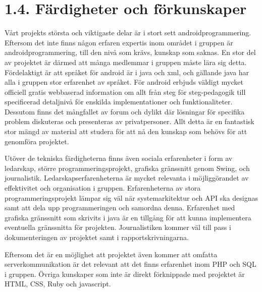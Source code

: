 \section{1.4. Färdigheter och förkunskaper}
Vårt projekts största och viktigaste delar är i stort sett androidprogrammering. Eftersom det inte finns någon erfaren expertis inom området i gruppen är androidprogrammering, till den nivå som krävs, kunskap som saknas. En stor del av projektet är därmed att många medlemmar i gruppen måste lära sig detta. Fördelaktigt är att språket för android är i java och xml, och gällande java har alla i gruppen stor erfarenhet av språket. För android erbjuds väldigt mycket officiell gratis webbaserad information om allt från steg för steg-pedagogik till specificerad detaljnivå för enskilda implementationer och funktionaliteter. Dessutom finns det mångfallet av forum och dylikt där lösningar för specifika problem diskuteras och presenteras av privatpersoner. Allt detta är en fantastisk stor mängd av material att studera för att nå den kunskap som behövs för att genomföra projektet.

Utöver de tekniska färdigheterna finns även sociala erfarenheter i form av ledarskap, större programmeringsprojekt, grafiska gränssnitt genom Swing, och journalistik.  Ledarskapserfarenheterna är mycket relevanta i möjliggörandet av effektivitet och organisation i gruppen. Erfarenheterna av stora programmeringsprojekt lämpar sig väl när systemarkitektur och API ska designas samt att dela upp programmeringen och samordna denna. Erfarenhet med grafiska gränssnitt som skrivits i java är en tillgång för att kunna implementera eventuella gränssnitta för projekten. Journalistiken kommer väl till pass i dokumenteringen av projektet samt i rapportskrivningarna. 

Eftersom det är en möjlighet att projektet även kommer att omfatta serverkommunikation är det relevant att det finns erfarenhet inom PHP och SQL i gruppen. Övriga kunskaper som inte är direkt förknippade med projektet är HTML, CSS, Ruby och javascript.
